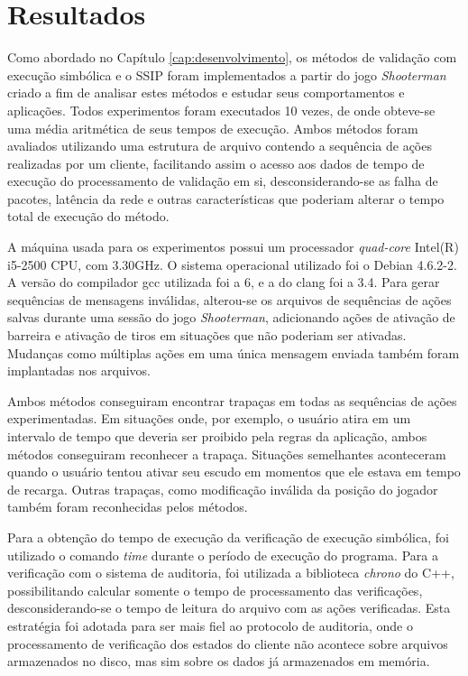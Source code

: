 \chapter{Resultados}
\label{cap:resultados}

Como abordado no Capítulo \ref{cap:desenvolvimento}, os métodos de validação com execução simbólica e o SSIP foram implementados a partir do jogo \textit{Shooterman} criado a fim de analisar estes métodos e estudar seus comportamentos e aplicações.
Todos experimentos foram executados 10 vezes, de onde obteve-se uma média aritmética de seus tempos de execução. Ambos métodos foram avaliados utilizando uma estrutura de arquivo contendo a sequência de ações realizadas por um cliente, facilitando assim o acesso aos dados de tempo de execução do processamento de validação em si, desconsiderando-se as falha de pacotes, latência da rede e outras características que poderiam alterar o tempo total de execução do método.

A máquina usada para os experimentos possui um processador \textit{quad-core} Intel(R) i5-2500 CPU, com 3.30GHz. O sistema operacional utilizado foi o Debian 4.6.2-2. A versão do compilador gcc utilizada foi a 6, e a do clang foi a 3.4.
Para gerar sequências de mensagens inválidas, alterou-se os arquivos de sequências de ações salvas durante uma sessão do jogo \textit{Shooterman}, adicionando ações de ativação de barreira e ativação de tiros em situações que não poderiam ser ativadas. Mudanças como múltiplas ações em uma única mensagem enviada também foram implantadas nos arquivos.

Ambos métodos conseguiram encontrar trapaças em todas as sequências de ações experimentadas. Em situações onde, por exemplo, o usuário atira em um intervalo de tempo que deveria ser proibido pela regras da aplicação, ambos métodos conseguiram reconhecer a trapaça. Situações semelhantes aconteceram quando o usuário tentou ativar seu escudo em momentos que ele estava em tempo de recarga. Outras trapaças, como modificação inválida da posição do jogador também foram reconhecidas pelos métodos.

Para a obtenção do tempo de execução da verificação de execução simbólica, foi utilizado o comando \textit{time} durante o período de execução do programa.
Para a verificação com o sistema de auditoria, foi utilizada a biblioteca \textit{chrono} do C++, possibilitando calcular somente o tempo de processamento das verificações, desconsiderando-se o tempo de leitura do arquivo com as ações verificadas. Esta estratégia foi adotada para ser mais fiel ao protocolo de auditoria, onde o processamento de verificação dos estados do cliente não acontece sobre arquivos armazenados no disco, mas sim sobre os dados já armazenados em memória. 



